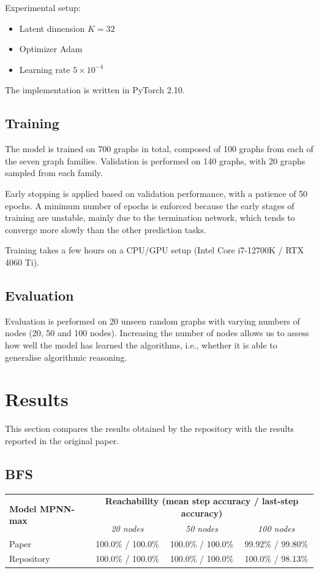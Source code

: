 \documentclass[11pt, a4paper]{article}
\begin{document}
Experimental setup:
\begin{itemize}
    \item Latent dimension $K = 32$
    \item Optimizer Adam
    \item Learning rate $5 \times 10^{-4}$
\end{itemize}

The implementation is written in PyTorch 2.10.

\subsection{Training}

The model is trained on 700 graphs in total, composed of 100 graphs from each of the seven graph families. Validation is performed on 140 graphs, with 20 graphs sampled from each family.

Early stopping is applied based on validation performance, with a patience of 50 epochs. A minimum number of epochs is enforced because the early stages of training are unstable, mainly due to the termination network, which tends to converge more slowly than the other prediction tasks.

Training takes a few hours on a CPU/GPU setup (Intel Core i7-12700K / RTX 4060 Ti).

\subsection{Evaluation}

Evaluation is performed on 20 unseen random graphs with varying numbers of nodes (20, 50 and 100 nodes). Increasing the number of nodes allows us to assess how well the model has learned the algorithms, i.e., whether it is able to generalise algorithmic reasoning.

\section{Results}

This section compares the results obtained by the repository with the results reported in the original paper.

\subsection{BFS}

\begin{table}[H]
\centering
\begin{tabular}{lccc}
\toprule
\multirow{2}{*}{\textbf{Model MPNN-max}} &
\multicolumn{3}{c}{\textbf{Reachability (mean step accuracy / last-step accuracy)}} \\
& \textit{20 nodes} & \textit{50 nodes} & \textit{100 nodes} \\
\midrule
Paper
& 100.0\% / 100.0\%
& 100.0\% / 100.0\%
& 99.92\% / 99.80\% \\
\midrule
Repository
& 100.0\% / 100.0\%
& 100.0\% / 100.0\%
& 100.0\% / 98.13\% \\
\bottomrule
\end{tabular}
\end{table}
\end{document}
